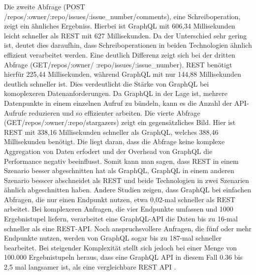 Die zweite Abfrage (POST /repos/:owner/:repo/issues/:issue\_number/comments), eine Schreiboperation, zeigt ein ähnliches Ergebniss. Hierbei ist GraphQL mit 606,34 Millisekunden leicht schneller als REST mit 627 Millisekunden. Da der Unterschied sehr gering ist, deutet dies daraufhin, dass Schreiboperationen in beiden Technologien ähnlich effizient verarbeitet werden.
Eine deutlich Differenz zeigt sich bei der dritten Abfrage (GET/repos/:owner/ :repo/issues/:issue\_number). REST benötigt hierfür 225,44 Millisekunden, während GraphQL mit nur 144,88 Millisekunden deutlich schneller ist. Dies verdeutlicht die Stärke von GraphQL bei komoplexeren Datenanforderungen. Da GraphQL in der Lage ist, mehrere Datenpunkte in einem einzelnen Aufruf zu bündeln, kann es die Anzahl der API-Aufrufe reduzieren und so effizienter arbeiten.
Die vierte Abfrage (GET/repos/:owner/:repo/stargazers) zeigt ein gegensätzliches Bild. Hier ist REST mit 338,16 Millisekunden schneller als GraphQL, welches 388,46 Millisekunden benötigt. Die liegt daran, dass die Abfrage keine komplexe Aggregation von Daten erfodert und der Overhead von GraphQL die Performance negativ beeinflusst.
Somit kann man sagen, dass REST in einem Szenario besser abgeschnitten hat als GraphQL, GraphQL in einem anderen Szenario besscer abschneidet als REST und beide Technologien in zwei Szenarien ähnlich abgeschnitten haben. 
\citep{graphqlreplacerest}
\newline
Andere Studien zeigen, dass GraphQL bei einfachen Abfragen, die nur einen Endpunkt nutzen, etwa 0,02-mal schneller als REST arbeitet. \citep{migrategraphql}
\newline
Bei komplexeren Anfragen, die vier Endpunkte umfassen und 1000 Ergebnistupel liefern, verarbeitet eine GraphQL-API die Daten bis zu 16-mal schneller als eine REST-API.\citep{analysegraphql}
\newline
Noch anspruchsvollere Anfragen, die fünf oder mehr Endpunkte nutzen, werden von GraphQL sogar bis zu 187-mal schneller bearbeitet.\citep{analysewebgraphql}
\newline
Bei steigender Komplexität stellt sich jedoch bei einer Menge von 100.000 Ergebnistupeln heraus, dass eine GraphQL API in diesem Fall 0.36 \citep{analysegraphql} bis 2,5 mal langsamer ist, als eine vergleichbare REST API \citep{restvsgraphql}.
